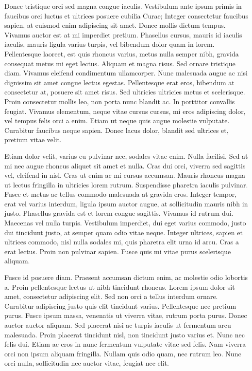 Donec tristique orci sed magna congue iaculis.
Vestibulum ante ipsum primis in faucibus orci luctus et ultrices posuere cubilia Curae; Integer consectetur faucibus sapien, at euismod enim adipiscing sit amet.
Donec mollis dictum tempus.
Vivamus auctor est at mi imperdiet pretium.
Phasellus cursus, mauris id iaculis iaculis, mauris ligula varius turpis, vel bibendum dolor quam in lorem.
Pellentesque laoreet, est quis rhoncus varius, metus nulla semper nibh, gravida consequat metus mi eget lectus.
Aliquam et magna risus.
Sed ornare tristique diam.
Vivamus eleifend condimentum ullamcorper.
Nunc malesuada augue ac nisi dignissim sit amet congue lectus egestas.
Pellentesque erat eros, bibendum at consectetur at, posuere sit amet risus.
Sed ultricies ultricies metus et scelerisque.
Proin consectetur mollis leo, non porta nunc blandit ac.
In porttitor convallis feugiat.
Vivamus elementum, neque vitae cursus cursus, mi eros adipiscing dolor, vel tempus felis orci a enim.
Etiam ut neque quis augue molestie vulputate.
Curabitur faucibus neque sapien.
Donec lacus dolor, blandit sed ultrices et, pretium vitae velit.

Etiam dolor velit, varius eu pulvinar nec, sodales vitae enim.
Nulla facilisi.
Sed at mi nec augue rhoncus aliquet sit amet et nulla.
Cras dui orci, viverra sed sagittis vel, eleifend in nisl.
Cras ut enim ac mi cursus accumsan.
Mauris rhoncus magna ut lectus fringilla in ultricies lorem rutrum.
Suspendisse pharetra iaculis pulvinar.
Fusce et metus ac tellus commodo malesuada at gravida eros.
Integer tempor, erat vel varius interdum, ligula ipsum auctor augue, at sollicitudin mauris nibh in justo.
Phasellus gravida est et lorem congue sagittis.
Vivamus id rutrum dui.
Maecenas vel nulla turpis.
Vestibulum imperdiet, dui eget varius commodo, justo dui tincidunt justo, at semper quam odio vitae neque.
Integer ultrices, sapien et ultrices commodo, nisl nulla sodales mi, quis pharetra elit urna id arcu.
Cras a erat lectus.
Proin non pulvinar sapien.
Fusce quis mi vitae purus scelerisque aliquam.

Fusce id posuere diam.
Praesent accumsan dictum enim, ac molestie odio lobortis a.
Proin pellentesque lectus ut nibh tincidunt rhoncus.
Lorem ipsum dolor sit amet, consectetur adipiscing elit.
Sed non orci a tellus interdum ornare.
Curabitur adipiscing justo quis elit tincidunt varius.
Pellentesque nec pretium purus.
Fusce ipsum massa, venenatis ut viverra vitae, rutrum porta purus.
Donec auctor auctor aliquam.
Sed placerat nisi ac turpis iaculis ut fermentum arcu malesuada.
Proin placerat tincidunt nisl, non tincidunt justo varius et.
Nunc nec felis dui.
Etiam ac eros in nunc fermentum vulputate vitae sed felis.
Nam viverra orci non ipsum aliquam fringilla.
Nullam quis odio quam, nec rutrum leo.
Nunc orci nulla, sollicitudin nec auctor vitae, feugiat nec elit.

